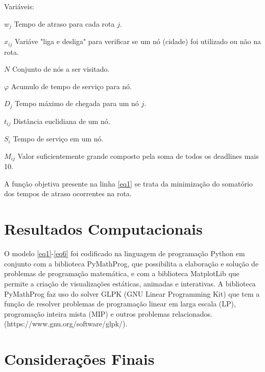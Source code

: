 \documentclass[12pt]{article}
\begin{document}
    
    Variáveis:
    
    $w_j$ Tempo de atraso para cada rota $j$.
    
    $x_{ij}$ Variáve "liga e desliga" para verificar se um nó (cidade) foi utilizado ou não na rota.
    
    $N$ Conjunto de nós a ser visitado.
    
    $\varphi$ Acumulo de tempo de serviço para nó.
    
    $D_j$ Tempo máximo de chegada para um nó $j$.
    
    $t_{ij}$ Distância euclidiana de um nó.
    
    $S_i$ Tempo de serviço em um nó.
    
    $M_{ij}$ Valor suficientemente grande composto pela soma de todos os deadlines mais 10.
    
    A função objetiva presente na linha \eqref{eq1} se trata da minimização do somatório dos tempos de atraso ocorrentes na rota.

\section{Resultados Computacionais}
    O modelo \eqref{eq1}-\eqref{eq6} foi codificado na linguagem de programação Python em conjunto com a biblioteca PyMathProg, que possibilita a elaboração e solução de problemas de programação matemática, e com a biblioteca MatplotLib que permite a criação de visualizações estáticas, animadas e interativas.
    A biblioteca PyMathProg faz uso do solver GLPK (GNU Linear Programming Kit) que tem a função de resolver problemas de programação linear em larga escala (LP), programação inteira mista (MIP) e outros problemas relacionados. (https://www.gnu.org/software/glpk/).
    
    
    


\section{Considerações Finais}




\end{document}
